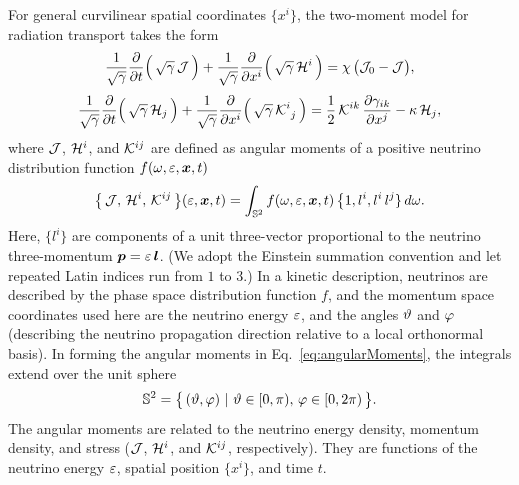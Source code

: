 \documentclass[10pt,preprint]{aastex}
\begin{document}
For general curvilinear spatial coordinates $\{x^{i}\}$, the two-moment model for radiation transport takes the form \citep[see, e.g.,][for fully general relativistic treatments]{shibata_etal_2011,cardall_etal_2013a}
\begin{equation}
  \frac{1}{\sqrt{\gamma}}\frac{\partial }{\partial t}\Big(\,\sqrt{\gamma}\,\mathcal{J}\,\Big)
  +\frac{1}{\sqrt{\gamma}}\frac{\partial }{\partial x^{i}}\Big(\,\sqrt{\gamma}\,\mathcal{H}^{i}\,\Big)=\chi\,\big(\mathcal{J}_{0}-\mathcal{J}\big),
  \label{eq:momentEquationEnergy}
\end{equation}
\begin{equation}
  \frac{1}{\sqrt{\gamma}}\frac{\partial }{\partial t}\Big(\,\sqrt{\gamma}\,\mathcal{H}_{j}\,\Big)
  +\frac{1}{\sqrt{\gamma}}\frac{\partial }{\partial x^{i}}\Big(\,\sqrt{\gamma}\,\mathcal{K}^{i}_{~j}\,\Big)
  =\frac{1}{2}\,\mathcal{K}^{ik}\,\frac{\partial \gamma_{ik}}{\partial x^{j}}-\kappa\,\mathcal{H}_{j},
  \label{eq:momentEquationMomentum}
\end{equation}
where $\mathcal{J}$, $\mathcal{H}^{i}$, and $\mathcal{K}^{ij}$ are defined as angular moments of a positive neutrino distribution function $f(\omega,\varepsilon,\boldsymbol{x},t)$
\begin{equation}
  \big\{\,\mathcal{J},\,\mathcal{H}^{i},\,\mathcal{K}^{ij}\,\big\}(\varepsilon,\boldsymbol{x},t)
  =\int_{\mathbb{S}^{2}}f(\omega,\varepsilon,\boldsymbol{x},t)\,\big\{1,l^{i},l^{i}\,l^{j}\}\,d\omega.  
  \label{eq:angularMoments}
\end{equation}
Here, $\{l^{i}\}$ are components of a unit three-vector proportional to the neutrino three-momentum $\boldsymbol{p}=\varepsilon\,\boldsymbol{l}$.  
(We adopt the Einstein summation convention and let repeated Latin indices run from $1$ to $3$.)
In a kinetic description, neutrinos are described by the phase space distribution function $f$, and the momentum space coordinates used here are the neutrino energy $\varepsilon$, and the angles $\vartheta$ and $\varphi$ (describing the neutrino propagation direction relative to a local orthonormal basis).  
In forming the angular moments in Eq.~\eqref{eq:angularMoments}, the integrals extend over the unit sphere
\begin{equation}
  \mathbb{S}^{2}=\big\{\,(\vartheta,\varphi)~|~\vartheta\in[0,\pi),\,\varphi\in[0,2\pi)\,\big\}.  
\end{equation}
The angular moments are related to the neutrino energy density, momentum density, and stress ($\mathcal{J}$, $\mathcal{H}^{i}$, and $\mathcal{K}^{ij}$, respectively).  
They are functions of the neutrino energy $\varepsilon$, spatial position $\{x^{i}\}$, and time $t$.  
\end{document}
